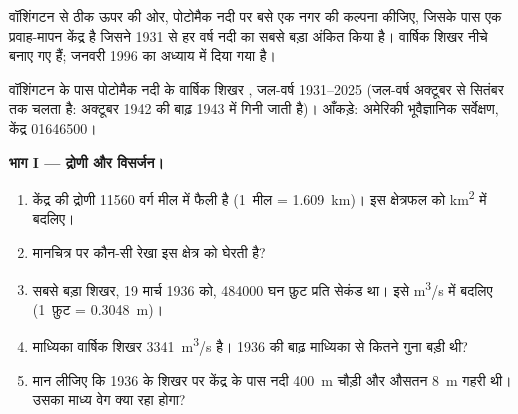 \begin{problem}
\label{pb:g10:drainage-basins:1}
वॉशिंगटन से ठीक ऊपर की ओर, पोटोमैक नदी पर बसे एक नगर की कल्पना कीजिए, जिसके पास एक
प्रवाह-मापन केंद्र है जिसने 1931 से हर वर्ष नदी का सबसे बड़ा  अंकित किया
है। वार्षिक शिखर नीचे बनाए गए हैं; जनवरी 1996 का
 अध्याय में दिया गया है।

\begin{center}

{\small वॉशिंगटन के पास पोटोमैक नदी के वार्षिक शिखर , जल-वर्ष
1931--2025 (जल-वर्ष अक्टूबर से सितंबर तक चलता है: अक्टूबर
1942 की बाढ़ 1943 में गिनी जाती है)। आँकड़े: अमेरिकी भूवैज्ञानिक सर्वेक्षण, केंद्र 01646500।}
\end{center}

\medskip
\noindent\textbf{भाग I --- द्रोणी और विसर्जन।}
\begin{enumerate}
  \item केंद्र की द्रोणी \num{11560} वर्ग मील में फैली है
        (\num{1}~मील = \qty{1.609}{km})। इस क्षेत्रफल को
        \unit{km^2} में बदलिए।
  \item मानचित्र पर कौन-सी रेखा इस क्षेत्र को घेरती है?
  \item सबसे बड़ा शिखर, 19 मार्च 1936 को, \num{484000} घन फ़ुट प्रति
        सेकंड था। इसे \unit{m^3/s} में बदलिए (\num{1}~फ़ुट =
        \qty{0.3048}{m})।
  \item माध्यिका वार्षिक शिखर \qty{3341}{m^3/s} है। 1936 की बाढ़ माध्यिका से
        कितने गुना बड़ी थी?
  \item मान लीजिए कि 1936 के शिखर पर केंद्र के पास नदी \qty{400}{m} चौड़ी और
        औसतन \qty{8}{m} गहरी थी। उसका माध्य
        वेग क्या रहा होगा?
\end{enumerate}


\end{problem}
